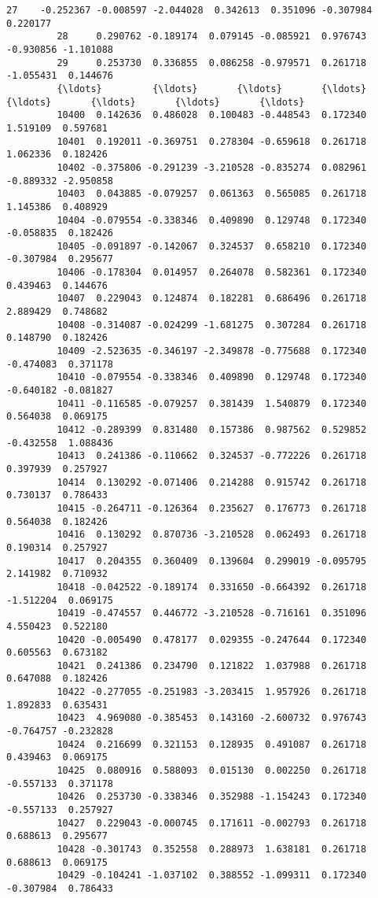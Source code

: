 \documentclass[11pt]{article}
\begin{document}
\begin{Verbatim}[commandchars=\\\{\}]
         27    -0.252367 -0.008597 -2.044028  0.342613  0.351096 -0.307984  0.220177   
         28     0.290762 -0.189174  0.079145 -0.085921  0.976743 -0.930856 -1.101088   
         29     0.253730  0.336855  0.086258 -0.979571  0.261718 -1.055431  0.144676   
         {\ldots}         {\ldots}       {\ldots}       {\ldots}       {\ldots}       {\ldots}       {\ldots}       {\ldots}   
         10400  0.142636  0.486028  0.100483 -0.448543  0.172340  1.519109  0.597681   
         10401  0.192011 -0.369751  0.278304 -0.659618  0.261718  1.062336  0.182426   
         10402 -0.375806 -0.291239 -3.210528 -0.835274  0.082961 -0.889332 -2.950858   
         10403  0.043885 -0.079257  0.061363  0.565085  0.261718  1.145386  0.408929   
         10404 -0.079554 -0.338346  0.409890  0.129748  0.172340 -0.058835  0.182426   
         10405 -0.091897 -0.142067  0.324537  0.658210  0.172340 -0.307984  0.295677   
         10406 -0.178304  0.014957  0.264078  0.582361  0.172340  0.439463  0.144676   
         10407  0.229043  0.124874  0.182281  0.686496  0.261718  2.889429  0.748682   
         10408 -0.314087 -0.024299 -1.681275  0.307284  0.261718  0.148790  0.182426   
         10409 -2.523635 -0.346197 -2.349878 -0.775688  0.172340 -0.474083  0.371178   
         10410 -0.079554 -0.338346  0.409890  0.129748  0.172340 -0.640182 -0.081827   
         10411 -0.116585 -0.079257  0.381439  1.540879  0.172340  0.564038  0.069175   
         10412 -0.289399  0.831480  0.157386  0.987562  0.529852 -0.432558  1.088436   
         10413  0.241386 -0.110662  0.324537 -0.772226  0.261718  0.397939  0.257927   
         10414  0.130292 -0.071406  0.214288  0.915742  0.261718  0.730137  0.786433   
         10415 -0.264711 -0.126364  0.235627  0.176773  0.261718  0.564038  0.182426   
         10416  0.130292  0.870736 -3.210528  0.062493  0.261718  0.190314  0.257927   
         10417  0.204355  0.360409  0.139604  0.299019 -0.095795  2.141982  0.710932   
         10418 -0.042522 -0.189174  0.331650 -0.664392  0.261718 -1.512204  0.069175   
         10419 -0.474557  0.446772 -3.210528 -0.716161  0.351096  4.550423  0.522180   
         10420 -0.005490  0.478177  0.029355 -0.247644  0.172340  0.605563  0.673182   
         10421  0.241386  0.234790  0.121822  1.037988  0.261718  0.647088  0.182426   
         10422 -0.277055 -0.251983 -3.203415  1.957926  0.261718  1.892833  0.635431   
         10423  4.969080 -0.385453  0.143160 -2.600732  0.976743 -0.764757 -0.232828   
         10424  0.216699  0.321153  0.128935  0.491087  0.261718  0.439463  0.069175   
         10425  0.080916  0.588093  0.015130  0.002250  0.261718 -0.557133  0.371178   
         10426  0.253730 -0.338346  0.352988 -1.154243  0.172340 -0.557133  0.257927   
         10427  0.229043 -0.000745  0.171611 -0.002793  0.261718  0.688613  0.295677   
         10428 -0.301743  0.352558  0.288973  1.638181  0.261718  0.688613  0.069175   
         10429 -0.104241 -1.037102  0.388552 -1.099311  0.172340 -0.307984  0.786433   
         

\end{Verbatim}
\end{document}
